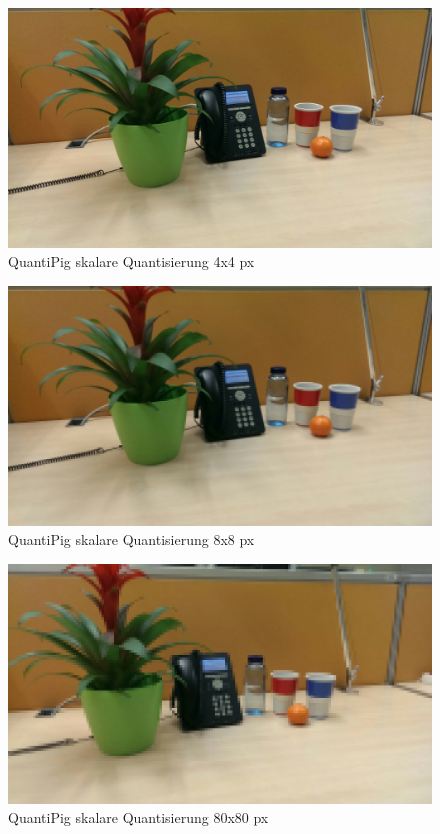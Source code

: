 \begin{landscape}
\begin{figure}[h]
	\centering
		\includegraphics[width=1.4\textwidth]{img/Fotos/QuantiPig_Skalar_4x4.jpg}
	\caption[QuantiPig skalare Quantisierung 4x4 px]{QuantiPig skalare Quantisierung 4x4 px}
	\label{fig:pig_skalar 4x4}
\end{figure}

\begin{figure}[h]
	\centering
		\includegraphics[width=1.4\textwidth]{img/Fotos/QuantiPig_Skalar_8x8.jpg}
	\caption[QuantiPig skalare Quantisierung 8x8 px]{QuantiPig skalare Quantisierung 8x8 px}
	\label{fig:pig_skalar 8x8}
\end{figure}

\begin{figure}[h]
	\centering
		\includegraphics[width=1.4\textwidth]{img/Fotos/QuantiPig_Skalar_80x80.jpg}
	\caption[QuantiPig skalare Quantisierung 80x80 px]{QuantiPig skalare Quantisierung 80x80 px}
	\label{fig:pig_skalar 8x8}
\end{figure}


\end{landscape}


